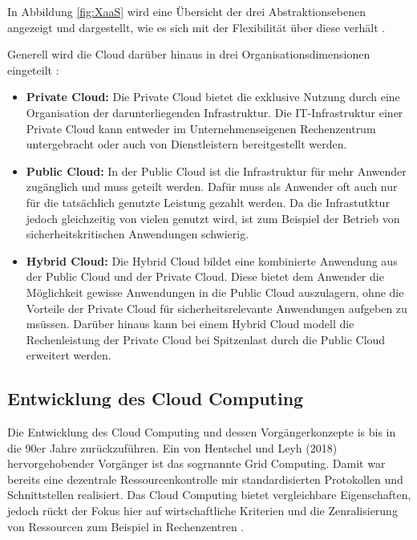 In Abbildung \ref{fig:XaaS} wird eine Übersicht der drei Abstraktionsebenen angezeigt und dargestellt, wie es sich mit der Flexibilität über diese verhält \cite[Vgl.][S. 33]{Maenhaut2016}.

Generell wird die Cloud darüber hinaus in drei Organisationsdimensionen eingeteilt \cite[Vgl. auch im Folgenden][S. 7ff]{Reinheimer2018}:
\begin{itemize}
\item \textbf{Private Cloud:} Die Private Cloud bietet die exklusive Nutzung durch eine Organisation der darunterliegenden Infrastruktur. 
Die IT-Infrastruktur einer Private Cloud kann entweder im Unternehmenseigenen Rechenzentrum untergebracht oder auch
von Dienstleistern bereitgestellt werden.
\item \textbf{Public Cloud:} In der Public Cloud ist die Infrastruktur für mehr Anwender zugänglich und muss geteilt werden. Dafür muss als Anwender oft
auch nur für die tatsächlich genutzte Leistung gezahlt werden. Da die Infrastutktur jedoch gleichzeitig von vielen genutzt wird, ist zum Beispiel der
Betrieb von sicherheitskritischen Anwendungen schwierig.
\item \textbf{Hybrid Cloud:} Die Hybrid Cloud bildet eine kombinierte Anwendung aus der Public Cloud und der Private Cloud. Diese bietet dem Anwender die
Möglichkeit gewisse Anwendungen in die Public Cloud auszulagern, ohne die Vorteile der Private Cloud für sicherheitsrelevante Anwendungen aufgeben zu msüssen.
Darüber hinaus kann bei einem Hybrid Cloud modell die Rechenleistung der Private Cloud bei Spitzenlast durch die Public Cloud erweitert werden. 
\end{itemize}

\pagebreak

\subsection{Entwicklung des Cloud Computing}

Die Entwicklung des Cloud Computing und dessen Vorgängerkonzepte is bis in die 90er Jahre zurückzuführen.
Ein von Hentschel und Leyh (2018) hervorgehobender Vorgänger ist das sogrnannte Grid Computing.
Damit war bereits eine dezentrale Ressourcenkontrolle mir standardisierten Protokollen und
Schnittstellen realisiert. Das Cloud Computing bietet vergleichbare Eigenschaften, jedoch rückt der
Fokus hier auf wirtschaftliche Kriterien und die Zenralisierung von Ressourcen zum Beispiel in
Rechenzentren \cite[Vgl.][S. 5f]{Reinheimer2018}.

